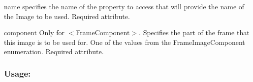\begin{DoxyItemize}
\item {\ttfamily name} specifies the name of the property to access that will provide the name of the Image to be used. Required attribute. \item {\ttfamily component} Only for {\ttfamily $<$Frame\+Component$>$}. Specifies the part of the frame that this image is to be used for. One of the values from the Frame\+Image\+Component enumeration. Required attribute.\end{DoxyItemize}
\hypertarget{fal_element_ref_fal_elem_ref_sec_21_3}{}\subsubsection{Usage\+:}\label{fal_element_ref_fal_elem_ref_sec_21_3}

